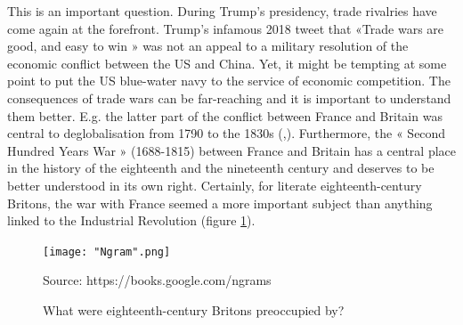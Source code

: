\documentclass[12pt,a4paper,notitlepage,english]{article}
\newcommand{\source}[1]{\caption*{\footnotesize Source: {#1}} }
\begin{document}
This is an important question.
During Trump’s presidency, trade rivalries have come again at the forefront.
Trump’s infamous 2018 tweet that «Trade wars are good, and easy to win » was not an appeal to a military resolution of the economic conflict between the US and China.
Yet, it might be tempting at some point to put the US blue-water navy to the service of economic competition.
The consequences of trade wars can be far-reaching and it is important to understand them better.
E.g. the latter part of the conflict between France and Britain was central to deglobalisation from 1790 to the 1830s (\cite{ORourke2006},\cite[table 4.5]{ORourke2010}).
Furthermore, the « Second Hundred Years War » (1688-1815) between France and Britain has a central place in the history of the eighteenth and the nineteenth century and deserves to be better understood in its own right.
Certainly, for literate eighteenth-century Britons, the war with France seemed a more important subject than anything linked to the Industrial Revolution (figure \ref{Ngram}).

\begin{figure}[h!]
	\caption{What were eighteenth-century Britons preoccupied by?}
	\centering
	\texttt{[image: "Ngram".png]}
	\source{https://books.google.com/ngrams}
	\label{Ngram}
\end{figure}





\end{document}
